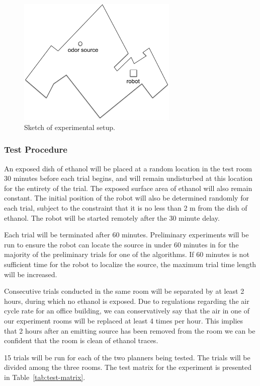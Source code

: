 \documentclass[submit, 12pt]{aiaa-pretty-modified}
\begin{document}
\begin{figure}
\begin{center}
\includegraphics[width=3in]{img/layout.pdf}
\caption{Sketch of experimental setup.}
\label{fig:layout}
\end{center}
\end{figure}


\subsubsection{Test Procedure}

An exposed dish of ethanol will be placed at a random location in the test room
30 minutes before each trial begins, and will remain undisturbed at this
location for the entirety of the trial. The exposed surface area of ethanol will
also remain constant. The initial position of the robot will also be determined
randomly for each trial, subject to the constraint that it is no less than 2 m
from the dish of ethanol.  The robot will be started remotely after the 30
minute delay.

Each trial will be terminated after 60 minutes. Preliminary experiments will be
run to ensure the robot can locate the source in under 60 minutes in for the
majority of the preliminary trials for one of the algorithms. If 60 minutes is
not sufficient time for the robot to localize the source, the maximum trial time
length will be increased.

Consecutive trials conducted in the same room will be separated by at least 2
hours, during which no ethanol is exposed. Due to regulations regarding the air
cycle rate for an office building, we can conservatively say that the air in one
of our experiment rooms will be replaced at least 4 times per hour. This implies
that 2 hours after an emitting source has been removed from the room we can be
confident that the room is clean of ethanol traces.

15 trials will be run for each of the two planners being tested. The trials will
be divided among the three rooms. The test matrix for the experiment is
presented in Table~\ref{tab:test-matrix}. 
\end{document}
